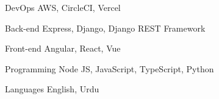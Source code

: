 

\begin{cvskills}

  \cvskill
    {DevOps} %
    {AWS, CircleCI, Vercel} %

  \cvskill
    {Back-end} %
    {Express, Django, Django REST Framework} %

  \cvskill
    {Front-end} %
    {Angular, React, Vue} %

  \cvskill
    {Programming} %
    {Node JS, JavaScript, TypeScript, Python} %

  \cvskill
    {Languages} %
    {English, Urdu} %

\end{cvskills}

